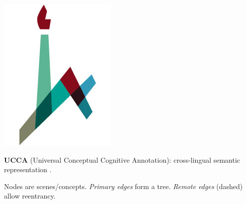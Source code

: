 \documentclass[extrafontsizes,60pt,twocolumn]{memoir}
\begin{document}
\begin{strip}
\begin{center}
\begin{minipage}[b]{.05\linewidth}
    \includegraphics[width=\linewidth]{huji_logo.jpg}
    \vspace{-2.5in}
  \end{minipage}
  \end{center}
\end{strip}



\textbf{UCCA} (Universal Conceptual Cognitive Annotation): cross-lingual semantic representation  \cite{abend2013universal}.

Nodes are scenes/concepts.
\textit{Primary edges} form a tree. \textit{Remote edges} (dashed) allow reentrancy.
\end{document}
